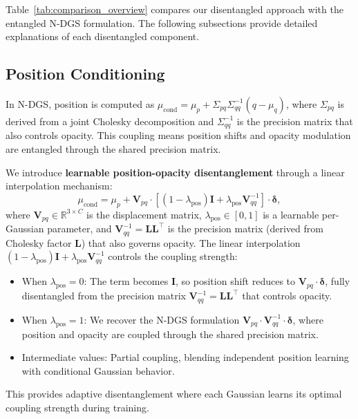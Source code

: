 \documentclass{article}
\begin{document}
Table~\ref{tab:comparison_overview} compares our disentangled approach with the entangled N-DGS formulation. The following subsections provide detailed explanations of each disentangled component.

\subsection{Position Conditioning}
\label{subsec:position}

In N-DGS, position is computed as $\mu_{\text{cond}} = \mu_p + \Sigma_{pq}\Sigma_{qq}^{-1}(q-\mu_q)$, where $\Sigma_{pq}$ is derived from a joint Cholesky decomposition and $\Sigma_{qq}^{-1}$ is the precision matrix that also controls opacity. This coupling means position shifts and opacity modulation are entangled through the shared precision matrix.

We introduce \textbf{learnable position-opacity disentanglement} through a linear interpolation mechanism:
\begin{equation}
\mu_{\text{cond}} = \mu_p + \mathbf{V}_{pq} \cdot \left[(1-\lambda_\text{pos}) \mathbf{I} + \lambda_\text{pos} \mathbf{V}_{qq}^{-1}\right] \cdot \boldsymbol{\delta},
\end{equation}
where $\mathbf{V}_{pq} \in \mathbb{R}^{3 \times C}$ is the displacement matrix, $\lambda_\text{pos} \in [0,1]$ is a learnable per-Gaussian parameter, and $\mathbf{V}_{qq}^{-1} = \mathbf{L}\mathbf{L}^\top$ is the precision matrix (derived from Cholesky factor $\mathbf{L}$) that also governs opacity. The linear interpolation $(1-\lambda_\text{pos}) \mathbf{I} + \lambda_\text{pos} \mathbf{V}_{qq}^{-1}$ controls the coupling strength:
\begin{itemize}
\item When $\lambda_\text{pos}=0$: The term becomes $\mathbf{I}$, so position shift reduces to $\mathbf{V}_{pq} \cdot \boldsymbol{\delta}$, fully disentangled from the precision matrix $\mathbf{V}_{qq}^{-1} = \mathbf{L}\mathbf{L}^\top$ that controls opacity.
\item When $\lambda_\text{pos}=1$: We recover the N-DGS formulation $\mathbf{V}_{pq} \cdot \mathbf{V}_{qq}^{-1} \cdot \boldsymbol{\delta}$, where position and opacity are coupled through the shared precision matrix.
\item Intermediate values: Partial coupling, blending independent position learning with conditional Gaussian behavior.
\end{itemize}
This provides adaptive disentanglement where each Gaussian learns its optimal coupling strength during training.
\end{document}
